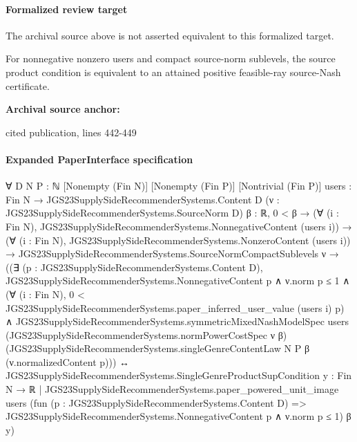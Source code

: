 \documentclass[10pt]{article}
\begin{document}
\paragraph{Formalized review target}
The archival source above is not asserted equivalent to this formalized target.
\begin{ReviewVerbatim}
For nonnegative nonzero users and compact source-norm sublevels, the source product condition is equivalent to an attained positive feasible-ray source-Nash certificate.
\end{ReviewVerbatim}

\textbf{Archival source anchor:} {\footnotesize\raggedright cited publication, lines 442-\allowbreak{}449\par}
\paragraph{Expanded PaperInterface specification}
\begin{ReviewVerbatim}
∀ {D N P : ℕ} [Nonempty (Fin N)] [Nonempty (Fin P)] [Nontrivial (Fin P)]
  {users : Fin N → JGS23SupplySideRecommenderSystems.Content D} (ν : JGS23SupplySideRecommenderSystems.SourceNorm D)
  {β : ℝ},
  0 < β →
    (∀ (i : Fin N), JGS23SupplySideRecommenderSystems.NonnegativeContent (users i)) →
      (∀ (i : Fin N), JGS23SupplySideRecommenderSystems.NonzeroContent (users i)) →
        JGS23SupplySideRecommenderSystems.SourceNormCompactSublevels ν →
          ((∃ (p : JGS23SupplySideRecommenderSystems.Content D),
              JGS23SupplySideRecommenderSystems.NonnegativeContent p ∧
                ν.norm p ≤ 1 ∧
                  (∀ (i : Fin N), 0 < JGS23SupplySideRecommenderSystems.paper_inferred_user_value (users i) p) ∧
                    JGS23SupplySideRecommenderSystems.symmetricMixedNashModelSpec users
                      (JGS23SupplySideRecommenderSystems.normPowerCostSpec ν β)
                      (JGS23SupplySideRecommenderSystems.singleGenreContentLaw N P β (ν.normalizedContent p))) ↔
            JGS23SupplySideRecommenderSystems.SingleGenreProductSupCondition
              {y : Fin N → ℝ |
                JGS23SupplySideRecommenderSystems.paper_powered_unit_image users
                  (fun (p : JGS23SupplySideRecommenderSystems.Content D) =>
                    JGS23SupplySideRecommenderSystems.NonnegativeContent p ∧ ν.norm p ≤ 1)
                  β y})
\end{ReviewVerbatim}
\end{document}
